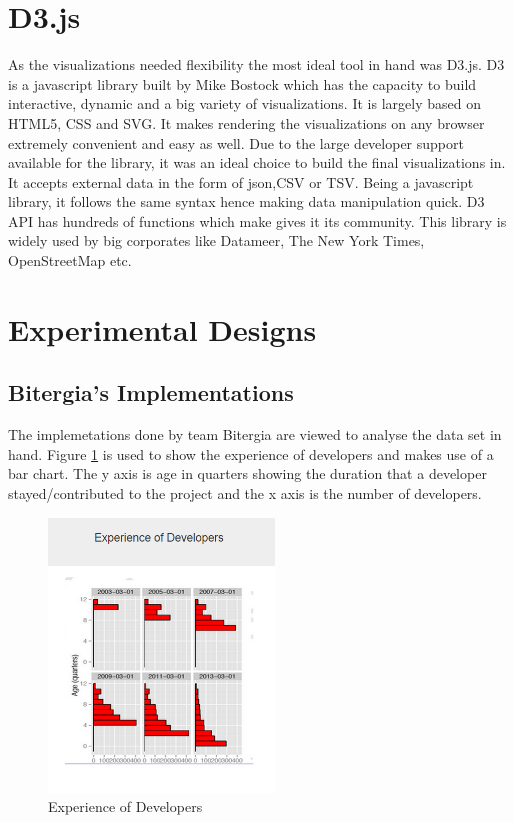 \documentclass[seploa]{beavtex}
\begin{document}
\section{D3.js}
As the visualizations needed flexibility the most ideal tool in hand was D3.js. D3 is a javascript library built by Mike Bostock which has the capacity to build interactive, dynamic and a big variety of visualizations. It is largely based on HTML5, CSS and SVG. It makes rendering the visualizations on any browser extremely convenient and easy as well. Due to the large developer support available for the library, it was an ideal choice to build the final visualizations in. It accepts external data in the form of json,CSV or TSV. Being a javascript library, it follows the same syntax hence making data manipulation quick. D3 API has hundreds of functions which make gives it its community. This library is widely used by big corporates like Datameer, The New York Times, OpenStreetMap etc.

\section{Experimental Designs}

\subsection{Bitergia's Implementations}
The implemetations done by team Bitergia are viewed to analyse the data set in hand. Figure \ref{fig:devExp} is used to show the experience of developers and makes use of a bar chart. The y axis is age in quarters showing the duration that a developer stayed/contributed to the project and the x axis is the number of developers.

\begin{figure}[H]
\begin{center}
\includegraphics[width=60mm]{image11.PNG}
\end{center}
\caption{Experience of Developers}
\label{fig:devExp}
\end{figure}
\end{document}
